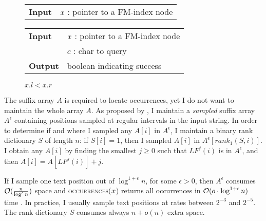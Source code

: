 \begin{figure*}
\begin{minipage}[t]{.5\textwidth}
\begin{algorithm}[H]
\begin{tabular}{ll}
\textbf{Input}  & $x$ : pointer to a FM-index node\\
\end{tabular}
\begin{algorithmic}[1]
\end{algorithmic}
\label{alg:fm-goroot}
\end{algorithm}
\end{minipage}
\hfill
\begin{minipage}[t]{.5\textwidth}
\begin{algorithm}[H]
\begin{tabular}{ll}
\textbf{Input}  & $x$ : pointer to a FM-index node\\
				& $c$ : char to query\\
\textbf{Output} & boolean indicating success\\
\end{tabular}
\begin{algorithmic}[1]
	\State \Return \False
\EndIf
{}
\State \Return $x.l < x.r$
\end{algorithmic}
\label{alg:fm-godownc}
\end{algorithm}
\end{minipage}
\end{figure*}

The suffix array $A$ is required to locate occurrences, yet I do not want to maintain the whole array $A$.
As proposed by \citeauthor{Ferragina2000}, I maintain a \emph{sampled} suffix array $A^{\epsilon}$ containing positions sampled at regular intervals in the input string.
In order to determine if and where I sampled any $A[i]$ in $A^{\epsilon}$, I maintain a binary rank dictionary $S$ of length $n$: if $S[i]=1$, then I sampled $A[i]$ in $A^{\epsilon}[rank_1(S,i)]$.
I obtain any $A[i]$ by finding the smallest $j \geq 0$ such that $LF^j(i)$ is in $A^{\epsilon}$, and then $A[i] = A[LF^j(i)] + j$.

If I sample one text position out of $\log^{1+\epsilon}{n}$, for some $\epsilon > 0$, then $A^{\epsilon}$ consumes $\mathcal{O}(\frac{n}{\log^{\epsilon}{n}})$ space and \textsc{occurrences}($x$) returns all occurrences in $\mathcal{O}(o \cdot \log^{1+\epsilon}{n})$ time \citep{Ferragina2000}.
In practice, I usually sample text positions at rates between $2^{-3}$ and $2^{-5}$.
The rank dictionary $S$ consumes always $n+o(n)$ extra space.

